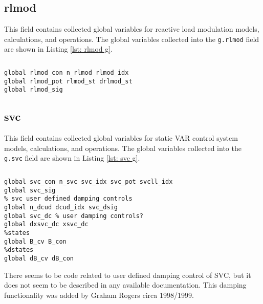\pagebreak
\subsection{rlmod}
This field contains collected global variables for reactive load modulation models, calculations, and operations.
The global variables collected into the \verb|g.rlmod| field are shown in Listing \ref{lst: rlmod g}.

\begin{lstlisting}[caption={Reactive Load Modulation Global Field Variables},label={lst: rlmod g}]
\end{lstlisting}\vspace{-2 em}
\begin{verbatim}
global rlmod_con n_rlmod rlmod_idx
global rlmod_pot rlmod_st drlmod_st
global rlmod_sig
\end{verbatim}

\subsection{svc}
This field contains collected global variables for static VAR control system models, calculations, and operations.
The global variables collected into the \verb|g.svc| field are shown in Listing \ref{lst: svc g}.

\begin{lstlisting}[caption={SVC Global Field Variables},label={lst: svc g}]
\end{lstlisting}\vspace{-2 em}
\begin{verbatim}
global svc_con n_svc svc_idx svc_pot svcll_idx
global svc_sig
% svc user defined damping controls
global n_dcud dcud_idx svc_dsig
global svc_dc % user damping controls?
global dxsvc_dc xsvc_dc
%states
global B_cv B_con
%dstates
global dB_cv dB_con
\end{verbatim}

There seems to be code related to user defined damping control of SVC, but it does not seem to be described in any available documentation. 
This damping functionality was added by Graham Rogers circa 1998/1999.


